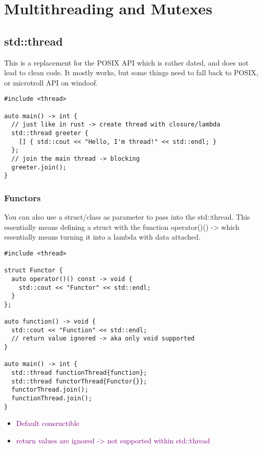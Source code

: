 \documentclass[main.tex,fontsize=8pt,paper=a4,paper=portrait,DIV=calc,]{scrartcl}
\begin{document}
\section{Multithreading and Mutexes}

\subsection{std::thread}
This is a replacement for the POSIX API which is rather dated, and does not lead to clean code.\newline
It mostly works, but some things need to fall back to POSIX, or microtroll API on windoof.

\begin{lstlisting}
#include <thread>

auto main() -> int {
  // just like in rust -> create thread with closure/lambda
  std::thread greeter {
    [] { std::cout << "Hello, I'm thread!" << std::endl; }
  };
  // join the main thread -> blocking
  greeter.join();
}
\end{lstlisting}

\subsubsection{Functors}
You can also use a struct/class as parameter to pass into the std::thread.\newline
This essentially means defining a struct with the function operator()() -> which essentially means turning it into a lambda with data attached.\newline
\begin{lstlisting}
#include <thread>

struct Functor {
  auto operator()() const -> void {
    std::cout << "Functor" << std::endl;
  }
};

auto function() -> void {
  std::cout << "Function" << std::endl;
  // return value ignored -> aka only void supported
}

auto main() -> int {
  std::thread functionThread{function};
  std::thread functorThread{Functor{}};
  functorThread.join();
  functionThread.join();
}
\end{lstlisting}
\begin{itemize}
\item \textcolor{purple}{Default consructible}
\item \textcolor{purple}{return values are ignored -> not supported within std::thread}
\end{itemize} 
\end{document}
